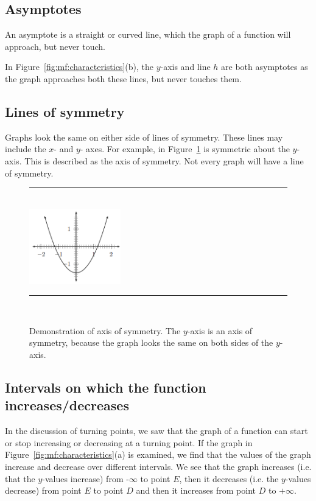 \subsection*{Asymptotes}
\nopragebreak
An asymptote is a straight or curved line, which the graph of a function will approach, but never touch.\par 
In Figure~\ref{fig:mf:characteristics}(b), the $y$-axis and line $h$ are both asymptotes as the graph approaches both these lines, but never touches them.\par 

\subsection*{Lines of symmetry}
\nopagebreak
Graphs look the same on either side of lines of symmetry. These lines may include the $x$- and $y$- axes. For example, in Figure~\ref{m39337*uid51!!!underscore!!!printimage} is symmetric about the $y$-axis. This is described as the axis of symmetry. Not every graph will have a line of symmetry.\par 

\setcounter{subfigure}{0}
\begin{figure}[H] %
\begin{center}
\rule[.1in]{\figurerulewidth}{.005in} \\
\includegraphics[width=150px]{col11306.imgs/m39337_MG10C11_036.png} %
\vspace{2pt}
\vspace{\rubberspace}\par 
\caption{Demonstration of axis of symmetry. The $y$-axis is an axis of symmetry, because the graph looks the same on both sides of the $y$-axis.}
\vspace{.1in}
\rule[.1in]{\figurerulewidth}{.005in} \\
\label{m39337*uid51!!!underscore!!!printimage}
\end{center}
\end{figure}       

\subsection*{Intervals on which the function increases/decreases}
\nopagebreak
In the discussion of turning points, we saw that the graph of a function can start or stop increasing or decreasing at a turning point. If the graph in Figure~\ref{fig:mf:characteristics}(a) is examined, we find that the values of the graph increase and decrease over different intervals. We see that the graph increases (i.e. that the $y$-values increase) from -$\infty $ to point $E$, then it decreases (i.e. the $y$-values decrease) from point $E$ to point $D$ and then it increases from point $D$ to $+ \infty $.\par 

